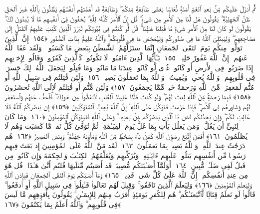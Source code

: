  ثُمَّ أَنزَلَ عَلَيكُم مِّنۢ بَعدِ ٱلغَمِّ أَمَنَةًۭ نُّعَاسًۭا يَغشَىٰ طَآئِفَةًۭ مِّنكُم ۖ وَطَآئِفَةٌۭ قَد أَهَمَّتهُم أَنفُسُهُم يَظُنُّونَ بِٱللَّهِ غَيرَ ٱلحَقِّ ظَنَّ ٱلجَٰهِلِيَّةِ ۖ يَقُولُونَ هَل لَّنَا مِنَ ٱلأَمرِ مِن شَىءٍۢ ۗ قُل إِنَّ ٱلأَمرَ كُلَّهُۥ لِلَّهِ ۗ يُخفُونَ فِىٓ أَنفُسِهِم مَّا لَا يُبدُونَ لَكَ ۖ يَقُولُونَ لَو كَانَ لَنَا مِنَ ٱلأَمرِ شَىءٌۭ مَّا قُتِلنَا هَـٰهُنَا ۗ قُل لَّو كُنتُم فِى بُيُوتِكُم لَبَرَزَ ٱلَّذِينَ كُتِبَ عَلَيهِمُ ٱلقَتلُ إِلَىٰ مَضَاجِعِهِم ۖ وَلِيَبتَلِىَ ٱللَّهُ مَا فِى صُدُورِكُم وَلِيُمَحِّصَ مَا فِى قُلُوبِكُم ۗ وَٱللَّهُ عَلِيمٌۢ بِذَاتِ ٱلصُّدُورِ ﴿١٥٤﴾
 إِنَّ ٱلَّذِينَ تَوَلَّوا۟ مِنكُم يَومَ ٱلتَقَى ٱلجَمعَانِ إِنَّمَا ٱستَزَلَّهُمُ ٱلشَّيطَٰنُ بِبَعضِ مَا كَسَبُوا۟ ۖ وَلَقَد عَفَا ٱللَّهُ عَنهُم ۗ إِنَّ ٱللَّهَ غَفُورٌ حَلِيمٌۭ ﴿١٥٥﴾
 يَـٰٓأَيُّهَا ٱلَّذِينَ ءَامَنُوا۟ لَا تَكُونُوا۟ كَٱلَّذِينَ كَفَرُوا۟ وَقَالُوا۟ لِإِخوَٟنِهِم إِذَا ضَرَبُوا۟ فِى ٱلأَرضِ أَو كَانُوا۟ غُزًّۭى لَّو كَانُوا۟ عِندَنَا مَا مَاتُوا۟ وَمَا قُتِلُوا۟ لِيَجعَلَ ٱللَّهُ ذَٟلِكَ حَسرَةًۭ فِى قُلُوبِهِم ۗ وَٱللَّهُ يُحىِۦ وَيُمِيتُ ۗ وَٱللَّهُ بِمَا تَعمَلُونَ بَصِيرٌۭ ﴿١٥٦﴾
 وَلَئِن قُتِلتُم فِى سَبِيلِ ٱللَّهِ أَو مُتُّم لَمَغفِرَةٌۭ مِّنَ ٱللَّهِ وَرَحمَةٌ خَيرٌۭ مِّمَّا يَجمَعُونَ ﴿١٥٧﴾
 وَلَئِن مُّتُّم أَو قُتِلتُم لَإِلَى ٱللَّهِ تُحشَرُونَ ﴿١٥٨﴾
 فَبِمَا رَحمَةٍۢ مِّنَ ٱللَّهِ لِنتَ لَهُم ۖ وَلَو كُنتَ فَظًّا غَلِيظَ ٱلقَلبِ لَٱنفَضُّوا۟ مِن حَولِكَ ۖ فَٱعفُ عَنهُم وَٱستَغفِر لَهُم وَشَاوِرهُم فِى ٱلأَمرِ ۖ فَإِذَا عَزَمتَ فَتَوَكَّل عَلَى ٱللَّهِ ۚ إِنَّ ٱللَّهَ يُحِبُّ ٱلمُتَوَكِّلِينَ ﴿١٥٩﴾
 إِن يَنصُركُمُ ٱللَّهُ فَلَا غَالِبَ لَكُم ۖ وَإِن يَخذُلكُم فَمَن ذَا ٱلَّذِى يَنصُرُكُم مِّنۢ بَعدِهِۦ ۗ وَعَلَى ٱللَّهِ فَليَتَوَكَّلِ ٱلمُؤمِنُونَ ﴿١٦٠﴾
 وَمَا كَانَ لِنَبِىٍّ أَن يَغُلَّ ۚ وَمَن يَغلُل يَأتِ بِمَا غَلَّ يَومَ ٱلقِيَـٰمَةِ ۚ ثُمَّ تُوَفَّىٰ كُلُّ نَفسٍۢ مَّا كَسَبَت وَهُم لَا يُظلَمُونَ ﴿١٦١﴾
 أَفَمَنِ ٱتَّبَعَ رِضوَٟنَ ٱللَّهِ كَمَنۢ بَآءَ بِسَخَطٍۢ مِّنَ ٱللَّهِ وَمَأوَىٰهُ جَهَنَّمُ ۚ وَبِئسَ ٱلمَصِيرُ ﴿١٦٢﴾
 هُم دَرَجَٰتٌ عِندَ ٱللَّهِ ۗ وَٱللَّهُ بَصِيرٌۢ بِمَا يَعمَلُونَ ﴿١٦٣﴾
 لَقَد مَنَّ ٱللَّهُ عَلَى ٱلمُؤمِنِينَ إِذ بَعَثَ فِيهِم رَسُولًۭا مِّن أَنفُسِهِم يَتلُوا۟ عَلَيهِم ءَايَـٰتِهِۦ وَيُزَكِّيهِم وَيُعَلِّمُهُمُ ٱلكِتَـٰبَ وَٱلحِكمَةَ وَإِن كَانُوا۟ مِن قَبلُ لَفِى ضَلَـٰلٍۢ مُّبِينٍ ﴿١٦٤﴾
 أَوَلَمَّآ أَصَـٰبَتكُم مُّصِيبَةٌۭ قَد أَصَبتُم مِّثلَيهَا قُلتُم أَنَّىٰ هَـٰذَا ۖ قُل هُوَ مِن عِندِ أَنفُسِكُم ۗ إِنَّ ٱللَّهَ عَلَىٰ كُلِّ شَىءٍۢ قَدِيرٌۭ ﴿١٦٥﴾
 وَمَآ أَصَـٰبَكُم يَومَ ٱلتَقَى ٱلجَمعَانِ فَبِإِذنِ ٱللَّهِ وَلِيَعلَمَ ٱلمُؤمِنِينَ ﴿١٦٦﴾
 وَلِيَعلَمَ ٱلَّذِينَ نَافَقُوا۟ ۚ وَقِيلَ لَهُم تَعَالَوا۟ قَـٰتِلُوا۟ فِى سَبِيلِ ٱللَّهِ أَوِ ٱدفَعُوا۟ ۖ قَالُوا۟ لَو نَعلَمُ قِتَالًۭا لَّٱتَّبَعنَـٰكُم ۗ هُم لِلكُفرِ يَومَئِذٍ أَقرَبُ مِنهُم لِلإِيمَـٰنِ ۚ يَقُولُونَ بِأَفوَٟهِهِم مَّا لَيسَ فِى قُلُوبِهِم ۗ وَٱللَّهُ أَعلَمُ بِمَا يَكتُمُونَ ﴿١٦٧﴾
